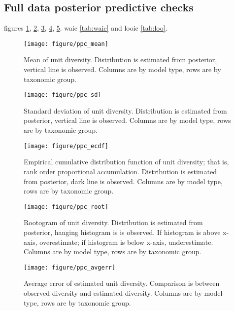 \documentclass[12pt,letterpaper]{article}
\begin{document}
\subsection{Full data posterior predictive checks}
figures \ref{fig:ppc_mean}, \ref{fig:ppc_sd}, \ref{fig:ppc_ecdf}, \ref{fig:ppc_root}, \ref{fig:ppc_avgerr}. waic \ref{tab:waic} and looic \ref{tab:loo}.

\afterpage{\clearpage}
\begin{figure}[h]
  \centering
  \texttt{[image: figure/ppc\_mean]}
  \caption{Mean of unit diversity. Distribution is estimated from posterior, vertical line is observed. Columns are by model type, rows are by taxonomic group.}
  \label{fig:ppc_mean}
\end{figure}

\afterpage{\clearpage}
\begin{figure}[h]
  \centering
  \texttt{[image: figure/ppc\_sd]}
  \caption{Standard deviation of unit diversity. Distribution is estimated from posterior, vertical line is observed. Columns are by model type, rows are by taxonomic group.}
  \label{fig:ppc_sd}
\end{figure}

\afterpage{\clearpage}
\begin{figure}[h]
  \centering
  \texttt{[image: figure/ppc\_ecdf]}
  \caption{Empirical cumulative distribution function of unit diversity; that is, rank order proportional accumulation. Distribution is estimated from posterior, dark line is observed. Columns are by model type, rows are by taxonomic group.}
  \label{fig:ppc_ecdf}
\end{figure}

\afterpage{\clearpage}
\begin{figure}[h]
  \centering
  \texttt{[image: figure/ppc\_root]}
  \caption{Rootogram of unit diversity. Distribution is estimated from posterior, hanging histogram is is observed. If histogram is above x-axis, overestimate; if histogram is below x-axis, underestimate. Columns are by model type, rows are by taxonomic group.}
  \label{fig:ppc_root}
\end{figure}

\afterpage{\clearpage}
\begin{figure}[h]
  \centering
  \texttt{[image: figure/ppc\_avgerr]}
  \caption{Average error of estimated unit diversity. Comparison is between observed diversity and estimated diversity. Columns are by model type, rows are by taxonomic group.}
  \label{fig:ppc_avgerr}
\end{figure}
\end{document}
